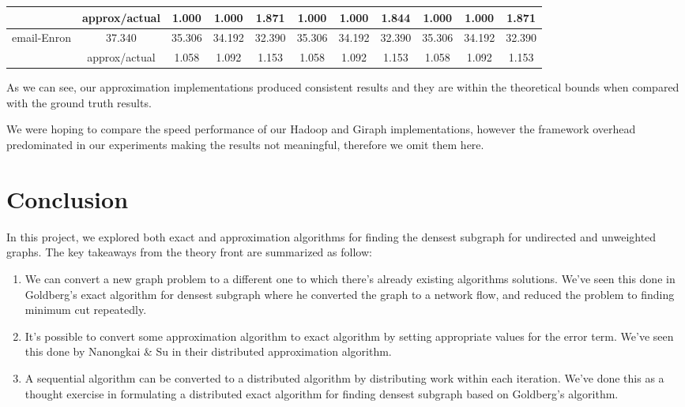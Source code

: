 \documentclass{article}
\begin{document}
\begin{landscape}
\begin{tabular}{|c|c|ccc|ccc|ccc|}
                               & approx/actual  & 1.000   & 1.000   & 1.871                    & 1.000   & 1.000   & 1.844    & 1.000   & 1.000   & 1.871      \\
\hline
\multirow{2}{*}{ email-Enron } & 37.340         & 35.306  & 34.192  & 32.390                   & 35.306  & 34.192  & 32.390   & 35.306  & 34.192  & 32.390     \\
                               & approx/actual  & 1.058   & 1.092   & 1.153                    & 1.058   & 1.092   & 1.153    & 1.058   & 1.092   & 1.153      \\
\hline
\end{tabular}

As we can see, our approximation implementations produced consistent results and they are within the theoretical bounds when compared with the ground truth results.

We were hoping to compare the speed performance of our Hadoop and Giraph implementations, however the framework overhead predominated in our experiments making the results not meaningful, therefore we omit them here.

\end{landscape}


\section{Conclusion}
In this project, we explored both exact and approximation algorithms for finding the densest subgraph for undirected and unweighted graphs. The key takeaways from the theory front are summarized as follow:

\begin{enumerate}
  \item We can convert a new graph problem to a different one to which there's already existing algorithms solutions. We've seen this done in Goldberg's exact algorithm for densest subgraph where he converted the graph to a network flow, and reduced the problem to finding minimum cut repeatedly.
  \item It's possible to convert some approximation algorithm to exact algorithm by setting appropriate values for the error term. We've seen this done by Nanongkai \& Su in their distributed approximation algorithm.
  \item A sequential algorithm can be converted to a distributed algorithm by distributing work within each iteration. We've done this as a thought exercise in formulating a distributed exact algorithm for finding densest subgraph based on Goldberg's algorithm.
\end{enumerate}
\end{document}
